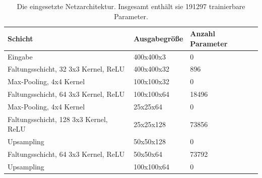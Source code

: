 \begin{table}
    \centering
    \caption{Die eingesetzte Netzarchitektur. Insgesamt enth\"alt sie
        191297 trainierbare Parameter.}
    \label{tab:netzarchitektur}
    \begin{tabular}{|l|l|l|}
        \hline

        \textbf{Schicht}                       & \textbf{Ausgabegr\"o{\ss}e} & \textbf{Anzahl Parameter} \\

        \hline

        Eingabe                                & 400x400x3                   & 0                         \\

        \hline

        Faltungsschicht, 32 3x3 Kernel, ReLU   & 400x400x32                  & 896                       \\

        \hline

        Max-Pooling, 4x4 Kernel                & 100x100x32                  & 0                         \\

        \hline

        Faltungsschicht, 64 3x3 Kernel, ReLU   & 100x100x64                  & 18496                     \\

        \hline

        Max-Pooling, 4x4 Kernel                & 25x25x64                    & 0                         \\

        \hline

        Faltungsschicht, 128 3x3 Kernel, ReLU  & 25x25x128                   & 73856                     \\

        \hline

        Upsampling                             & 50x50x128                   & 0                         \\

        \hline

        Faltungsschicht, 64 3x3 Kernel, ReLU   & 50x50x64                    & 73792                     \\

        \hline

        Upsampling                             & 100x100x64                  & 0                         \\


\end{tabular}
\end{table}

